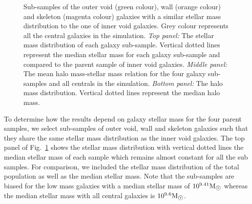 \documentclass[a4paper,fleqn,usenatbib,letter]{mnras}
\newcommand{\Msun}{\rm M_{\sun}}
\begin{document}
\begin{figure}
\begin{tabular}{c}
	\end{tabular}	
    \caption{ Sub-samples of the outer void (green colour), wall (orange colour) and skeleton (magenta colour) galaxies with a similar stellar mass distribution to the one of inner void galaxies. Grey colour represents all the central galaxies in the simulation. \textit{Top panel:} The stellar mass distribution of each galaxy sub-sample. Vertical dotted lines represent the median stellar mass for each galaxy sub-sample and compared to the parent sample of inner void galaxies. \textit{Middle panel:} The mean halo mass-stellar mass relation for the four galaxy sub-samples and all centrals in the simulation. \textit{Bottom panel:} The halo mass distribution. Vertical dotted lines represent the median halo mass.}
    \label{fig:gmf_samestellarmass}
\end{figure}

To determine how the results depend on galaxy stellar mass for the four parent samples, we select  
sub-samples of outer void, wall and skeleton galaxies such that they share the same stellar mass distribution  as  the inner void galaxies. The top panel of Fig.~\ref{fig:gmf_samestellarmass} shows the stellar mass distribution with vertical dotted lines the median stellar mass of each sample which remains almost constant for all the sub samples. For comparison, we included the stellar mass distribution of the total population as well as the median stellar mass. Note that the sub-samples are biased for the low mass galaxies  with a median stellar mass of $10^{9.41}\Msun$ whereas the median stellar mass with all central galaxies is $10^{9.6}\Msun$. 

\end{document}
